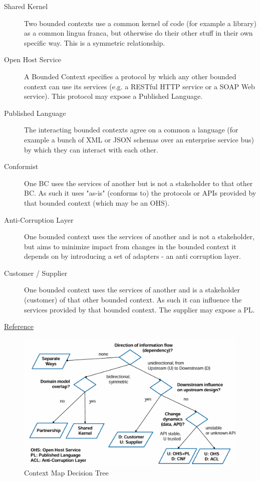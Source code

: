 \documentclass[../Main.tex]{subfiles}
\begin{document}
\begin{description}
    \item[Shared Kernel] Two bounded contexts use a common kernel of code (for example a library) as a common lingua
    franca, but otherwise do their other stuff in their own specific way. This is a symmetric relationship.
    \item[Open Host Service] A Bounded Context specifies a protocol by which any other bounded context can use its services (e.g. 
    a RESTful HTTP service or a SOAP Web service). This protocol may expose a Published Language.
    \item[Published Language] The interacting bounded contexts agree on a common a language (for example a bunch of XML or 
    JSON schemas over an enterprise service bus) by which they can interact with each other.
    \item[Conformist] One BC uses the services of another but is not a stakeholder to that other BC. As such it uses "as-is" 
    (conforms to) the protocols or APIs provided by that bounded context (which may be an OHS).
    \item[Anti-Corruption Layer] One bounded context uses the services of another and is not a stakeholder, but aims to minimize 
    impact from changes in the bounded context it depends on by introducing a set of adapters - an anti
    corruption layer.
    \item[Customer / Supplier] One bounded context uses the services of another and is a stakeholder (customer) of that other 
    bounded context. As such it can influence the services provided by that bounded context. The supplier 
    may expose a PL.
\end{description}
\href{https://www.methodsandtools.com/archive/archive.php?id=97}{Reference}

\begin{figure}[H]
    \centering
    \includegraphics[width=0.75\linewidth]{Images/context-map-decision-tree.png}
    \caption{Context Map Decision Tree}
\end{figure}
\end{document}
